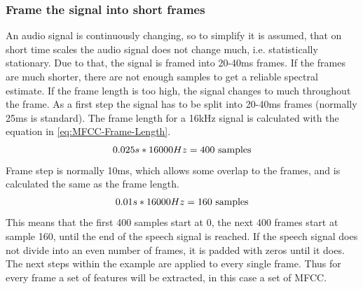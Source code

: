 \subsubsection{Frame the signal into short frames}
An audio signal is continuously changing, so to simplify it is assumed, that on short time scales the audio signal does not change much, i.e. statistically stationary. Due to that, the signal is framed into 20-40ms frames. If the frames are much shorter, there are not enough samples to get a reliable spectral estimate. If the frame length is too high, the signal changes to much throughout the frame.
\newline 
\newline
As a first step the signal has to be split into 20-40ms frames (normally 25ms is standard). The frame length for a 16kHz signal is calculated with the equation in \ref{eq:MFCC-Frame-Length}. 
\begin{equation}
    \centering
    0.025s * 16000Hz = 400 \ \text{samples}
    \label{eq:MFCC-Frame-Length}
\end{equation}
Frame step is normally 10ms, which allows some overlap to the frames, and is calculated the same as the frame length.
\begin{equation}
    \centering
    0.01s * 16000Hz = 160 \ \text{samples}
    \label{eq:MFCC-Frame-Step}
\end{equation}
This means that the first 400 samples start at 0, the next 400 frames start at sample 160, until the end of the speech signal is reached. If the speech signal does not divide into an even number of frames, it is padded with zeros until it does. The next steps within the example are applied to every single frame. Thus for every frame a set of features will be extracted, in this case a set of \gls{MFCC}.

